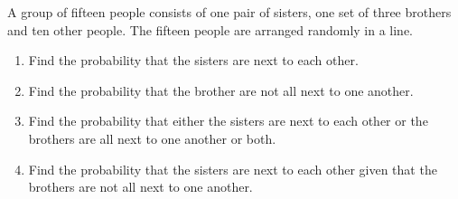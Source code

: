 \clearpage
\begin{problem}
    A group of fifteen people consists of one pair of sisters, one set of three brothers and ten other people. The fifteen people are arranged randomly in a line.
    \begin{enumerate}
        \item Find the probability that the sisters are next to each other.
        \item Find the probability that the brother are not all next to one another.
        \item Find the probability that either the sisters are next to each other or the brothers are all next to one another or both.
        \item Find the probability that the sisters are next to each other given that the brothers are not all next to one another.
    \end{enumerate}
\end{problem}
